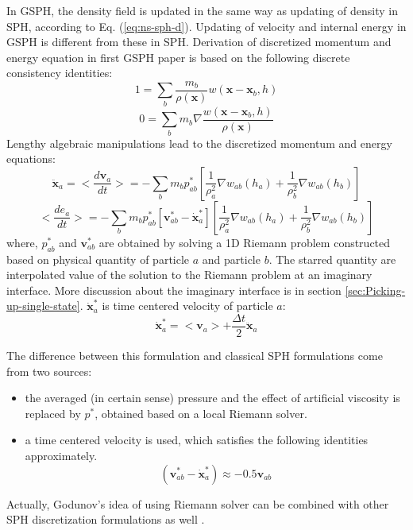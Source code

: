 In GSPH, the density field is updated in the same way as updating of density in SPH, according to Eq. (\ref{eq:ns-sph-d}). Updating of velocity and internal energy in GSPH is different from these in SPH. 
Derivation of discretized momentum and energy equation in first GSPH paper \citep{inutsuka2002reformulation} is based on the following discrete consistency identities: 
\begin{equation}
1=\sum_{b} \frac{m_{b}}{\rho(\textbf{x})}w(\textbf{x} - \textbf{x}_{b}, h)
\label{eq:GSPH-basic1}
\end{equation}
\begin{equation}
0=\sum_{b} m_{b} \nabla \frac{w(\textbf{x} - \textbf{x}_{b}, h)}{\rho(\textbf{x})}
\label{eq:GSPH-basic2}
\end{equation}
Lengthy algebraic manipulations \citep{inutsuka2002reformulation,iwasaki2011smoothed} lead to the discretized momentum and energy equations:
\begin{equation}
\ddot{\textbf{x}}_{a} = <\dfrac{d \textbf{v}_{a}}{dt}>= -\sum_{b} m_{b} p_{a b}^{\ast} \left[\frac{1}{\rho_{a}^2} \nabla w_{a b}(h_{a}) + \frac{1}{\rho_{b}^2} \nabla w_{a b}(h_{b}) \right]
\label{eq:gov-gsph-v-simple-form}
\end{equation}
\begin{equation}
<\dfrac{d e_{a}}{dt}>= - \sum_{b} m_{b} p_{a b}^{\ast} [\textbf{v}_{a b}^{\ast} - \dot{\textbf{x}}_{a}^{\ast}] \left[\frac{1}{\rho_{a}^2} \nabla w_{a b}(h_{a}) + \frac{1}{\rho_{b}^2} \nabla w_{a b}(h_{b}) \right]
\label{eq:gov-gsph-e-simple-form}
\end{equation}
where, $p_{a b}^{\ast}$ and $\textbf{v}_{a b}^{\ast}$ are obtained by solving a 1D Riemann problem constructed based on physical quantity of particle $a$ and particle $b$. The starred quantity are interpolated value of the solution to the Riemann problem at an imaginary interface. More discussion about the imaginary interface is in section \ref{sec:Picking-up-single-state}.
$\dot{\textbf{x}}_{a}^{\ast}$ is time centered velocity of particle $a$:
\begin{equation}
\dot{\textbf{x}}_{a}^{\ast} = <\textbf{v}_{a}> + \frac{\Delta t}{2} \ddot{\textbf{x}}_{a}
\end{equation}

The difference between this formulation and classical SPH formulations come from two sources: 
\begin{itemize}
\item the averaged (in certain sense) pressure and the effect of artificial viscosity is replaced by  $p^{\ast}$, obtained based on a local Riemann solver.
\item a time centered velocity is used, which satisfies the following identities approximately. 
\begin{equation}
\left( \textbf{v}_{a b}^{\ast} - \dot{\textbf{x}}_{a}^{\ast} \right) \approx -0.5 \textbf{v}_{a b}
\label{eq:SPH-GSPH-difference2}
\end{equation}
\end{itemize}
Actually, Godunov's idea of using Riemann solver can be combined with other SPH discretization formulations as well \citep{cha2003implementations}. 

